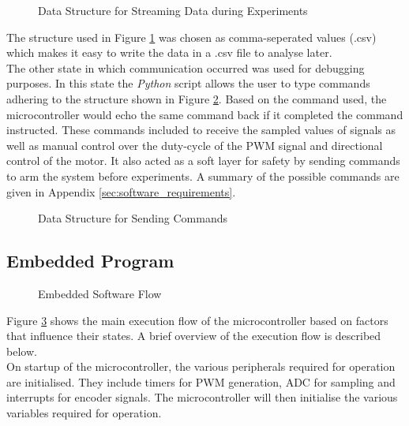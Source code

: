 \begin{figure}[h]
	\centering
	
	\caption{Data Structure for Streaming Data during Experiments}
	\label{fig:data_struct}
\end{figure}

The structure used in Figure \ref{fig:data_struct} was chosen as comma-seperated values (.csv) which makes it easy to write the data in a .csv file to analyse later.\\

The other state in which communication occurred was used for debugging purposes. In this state the \textit{Python} script allows the user to type commands adhering to the structure shown in Figure \ref{fig:uart_struct}. Based on the command used, the microcontroller would echo the same command back if it completed the command instructed. These commands included to receive the sampled values of signals as well as manual control over the duty-cycle of the PWM signal and directional control of the motor. It also acted as a soft layer for safety by sending commands to arm the system before experiments. A summary of the possible commands are given in Appendix \ref{sec:software_requirements}.


\begin{figure}[h]
	\centering
	
	\caption{Data Structure for Sending Commands}
	\label{fig:uart_struct}
\end{figure}


\subsection{Embedded Program}

\begin{figure}[h]
\centering

\caption{Embedded Software Flow}
\label{fig:software_flow}
\end{figure}


Figure \ref{fig:software_flow} shows the main execution flow of the microcontroller based on factors that influence their states. A brief overview of the execution flow is described below.\\

On startup of the microcontroller, the various peripherals required for operation are initialised. They include timers for PWM generation, ADC for sampling and interrupts for encoder signals. The microcontroller will then initialise the various variables required for operation.\\

